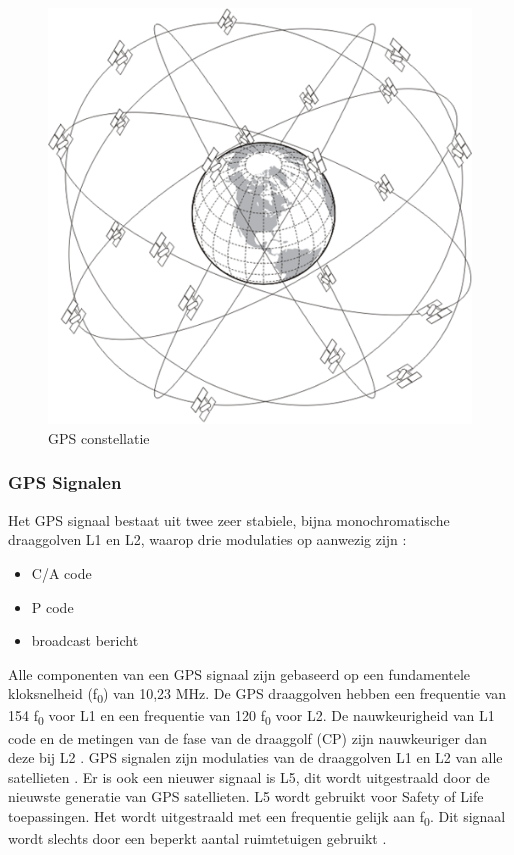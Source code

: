  \begin{figure}[hpb]
 	\includegraphics[scale=0.95]{GPS.png}
 	\caption{GPS constellatie \cite{LImgGPS}}
 	\label{imgGPS}
 \end{figure}

\subsubsection{ GPS Signalen}
Het GPS signaal bestaat uit twee zeer stabiele, bijna monochromatische draaggolven L1 en L2, waarop drie modulaties op aanwezig zijn \cite{LBibBeiDou4}:
\begin{itemize}
	\item C/A code
	\item P code
	\item broadcast bericht
\end{itemize}
Alle componenten van een GPS signaal zijn gebaseerd op een fundamentele kloksnelheid (f\textsubscript{0}) van 10,23 MHz. De GPS draaggolven hebben een frequentie van 154 f\textsubscript{0} voor L1 en een frequentie van 120 f\textsubscript{0} voor L2\cite{LBibGPS2}. De nauwkeurigheid van L1 code en de metingen van de fase van de draaggolf (CP) zijn nauwkeuriger dan deze bij L2 \cite{LBibBeiDou4}. GPS signalen zijn modulaties van de draaggolven L1 en L2 van alle satellieten \cite{LBibGPS3}. Er is ook een nieuwer signaal is L5, dit wordt uitgestraald door de nieuwste generatie van GPS satellieten. L5 wordt gebruikt voor Safety of Life toepassingen. Het wordt uitgestraald met een frequentie gelijk aan f\textsubscript{0}. Dit signaal wordt slechts door een beperkt aantal ruimtetuigen gebruikt \cite{LBibGNSS9}.

